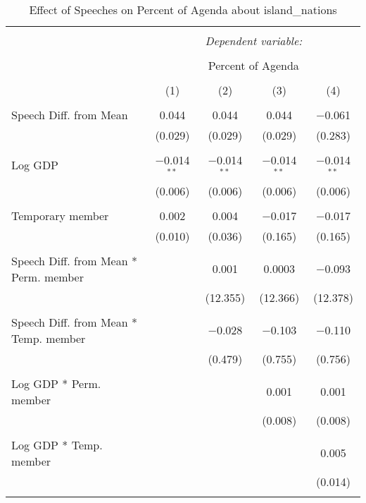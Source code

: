 
\begin{table}[!htbp] \centering 
  \caption{Effect of Speeches on Percent of Agenda about island_nations} 
  \label{} 
\begin{tabular}{@{\extracolsep{5pt}}lcccc} 
\\[-1.8ex]\hline 
\hline \\[-1.8ex] 
 & \multicolumn{4}{c}{\textit{Dependent variable:}} \\ 
\cline{2-5} 
\\[-1.8ex] & \multicolumn{4}{c}{Percent of Agenda} \\ 
\\[-1.8ex] & (1) & (2) & (3) & (4)\\ 
\hline \\[-1.8ex] 
 Speech Diff. from Mean & 0.044 & 0.044 & 0.044 & $-$0.061 \\ 
  & (0.029) & (0.029) & (0.029) & (0.283) \\ 
  & & & & \\ 
 Log GDP & $-$0.014$^{**}$ & $-$0.014$^{**}$ & $-$0.014$^{**}$ & $-$0.014$^{**}$ \\ 
  & (0.006) & (0.006) & (0.006) & (0.006) \\ 
  & & & & \\ 
 Temporary member & 0.002 & 0.004 & $-$0.017 & $-$0.017 \\ 
  & (0.010) & (0.036) & (0.165) & (0.165) \\ 
  & & & & \\ 
 Speech Diff. from Mean * Perm. member &  & 0.001 & 0.0003 & $-$0.093 \\ 
  &  & (12.355) & (12.366) & (12.378) \\ 
  & & & & \\ 
 Speech Diff. from Mean * Temp. member &  & $-$0.028 & $-$0.103 & $-$0.110 \\ 
  &  & (0.479) & (0.755) & (0.756) \\ 
  & & & & \\ 
 Log GDP * Perm. member &  &  & 0.001 & 0.001 \\ 
  &  &  & (0.008) & (0.008) \\ 
  & & & & \\ 
 Log GDP * Temp. member &  &  &  & 0.005 \\ 
  &  &  &  & (0.014) \\ 
  & & & & \\ 

\end{tabular}
\end{table}
